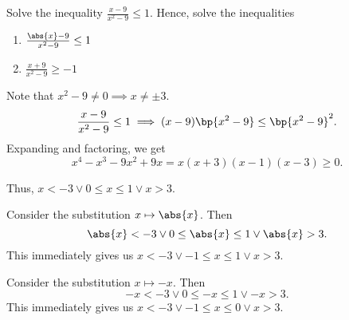 \begin{problem}
    Solve the inequality $\frac{x-9}{x^2-9} \leq 1$. Hence, solve the inequalities

    \begin{enumerate}
        \item $\frac{\abs{x}-9}{x^2-9} \leq 1$
        \item $\frac{x+9}{x^2-9} \geq -1$
    \end{enumerate}
\end{problem}
\begin{solution}
    Note that $x^2 - 9 \neq 0 \implies x \neq \pm 3$.
    \[\frac{x-9}{x^2-9} \leq 1 \implies (x-9)\bp{x^2-9} \leq \bp{x^2 - 9}^2.\] Expanding and factoring, we get \[x^4 - x^3 - 9x^2 + 9x = x(x+3)(x-1)(x-3) \geq 0.\]

    \begin{center}
    \end{center}
    Thus, $x < -3 \lor 0 \leq x \leq 1 \lor x > 3$.

    \begin{ppart}
        Consider the substitution $x \mapsto \abs{x}$. Then \[\abs{x} < -3 \lor 0 \leq \abs{x} \leq 1 \lor \abs{x} > 3.\] This immediately gives us $x < -3 \lor -1 \leq x \leq 1 \lor x > 3$.
    \end{ppart}
    \begin{ppart}
        Consider the substitution $x \mapsto -x$. Then \[-x < -3 \lor 0 \leq -x \leq 1 \lor -x > 3.\] This immediately gives us $x < -3 \lor -1 \leq x \leq 0 \lor x > 3$.
    \end{ppart}
\end{solution}

